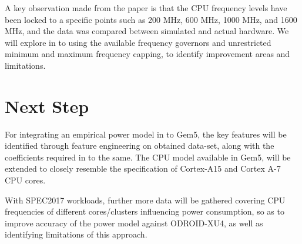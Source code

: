 \documentclass[conference]{IEEEtran}
\begin{document}
    \par A key observation made from the paper is that the CPU frequency levels have been locked to a specific points such as 200 MHz, 600 MHz, 1000 MHz, and 1600 MHz, and the data was compared between simulated and actual hardware. We will explore in to using the available frequency governors and unrestricted minimum and maximum frequency capping, to identify improvement areas and limitations.
    \medbreak

\section{Next Step}
    \par For integrating an empirical power model in to Gem5, the key features will be identified through feature engineering on obtained data-set, along with the coefficients required in to the same. The CPU model available in Gem5, will be extended to closely resemble the specification of Cortex-A15 and Cortex A-7 CPU cores.

    \par With SPEC2017 workloads, further more data will be gathered covering CPU frequencies of different cores/clusters influencing power consumption, so as to improve accuracy of the power model against ODROID-XU4, as well as identifying limitations of this approach.
    \medbreak




\end{document}
